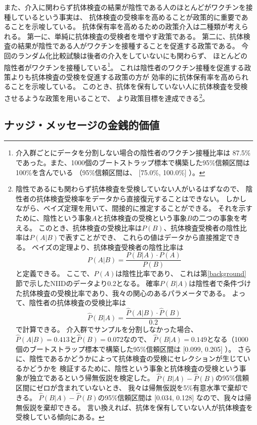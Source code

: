 \documentclass[
  11pt,
  a4paper,
]{article}
\begin{document}
また、介入に関わらず抗体検査の結果が陰性である人のほとんどがワクチンを接種しているという事実は、
抗体検査の受検率を高めることが政策的に重要であることを示唆している。
抗体保有率を高めるための政策介入は二種類が考えられる。
第一に、単純に抗体検査の受検者を増やす政策である。
第二に、抗体検査の結果が陰性である人がワクチンを接種することを促進する政策である。
今回のランダム化比較試験は後者の介入をしていないにも関わらず、
ほとんどの陰性者がワクチンを接種している\footnote{介入群ごとにデータを分割しない場合の陰性者のワクチン接種比率は
  87.5\%
  であった。また、1000個のブートストラップ標本で構築した95\%信頼区間は100\%を含んでいる
  （95\%信頼区間は、
  {[}75.0\%, 100.0\%{]}
  ）。}。
これは陰性者のワクチン接種を促進する政策よりも抗体検査の受検を促進する政策の方が
効率的に抗体保有率を高められることを示唆している。
このとき、抗体を保有していない人に抗体検査を受検させるような政策を用いることで、
より政策目標を達成できる\footnote{陰性であるにも関わらず抗体検査を受検していない人がいるはずなので、
  陰性者の抗体検査受検率をデータから直接復元することはできない。
  しかしながら、ベイズ定理を用いて、間接的に推定することができる。
  それを示すために、陰性という事象\(A\)と抗体検査の受検という事象\(B\)の二つの事象を考える。
  このとき、抗体検査の受検比率は\(P(B)\)、抗体検査受検者の陰性比率は\(P(A|B)\)で表すことができ、
  これらの値はデータから直接推定できる。
  ベイズの定理より、抗体検査受検者の陰性比率は
  \[ P(A|B) = \frac{P(B|A) \cdot P(A)}{P(B)} \]
  と定義できる。
  ここで、\(P(A)\)は陰性比率であり、
  これは第\ref{background}節で示したNIIDのデータより0.2となる。
  確率\(P(B|A)\)は陰性者で条件づけた抗体検査の受検比率であり、我々の関心のあるパラメータである。
  よって、陰性者の抗体検査の受検比率は
  \[ \hat{P}(B|A) = \frac{\hat{P}(A|B) \cdot \hat{P}(B)}{0.2} \]
  で計算できる。
  介入群でサンプルを分割しなかった場合、
  \(\hat{P}(A|B) = 0.413\)と\(\hat{P}(B) = 0.072\)なので、
  \(\hat{P}(B|A) = 0.149\)となる（1000個のブートストラップ標本で構築した95\%信頼区間は
  {[}0.099, 0.205{]} ）。
  さらに、陰性であるかどうかによって抗体検査の受検にセレクションが生じているかどうかを
  検証するために、陰性という事象と抗体検査の受検という事象が独立であるという帰無仮説を検定した。
  \(\hat{P}(B|A) - \hat{P}(B)\)の95\%信頼区間にゼロが含まれていないとき、
  我々は帰無仮説を5\%有意水準で棄却できる。
  \(\hat{P}(B|A) - \hat{P}(B)\)の95\%信頼区間は
  {[}0.034, 0.128{]}
  なので、我々は帰無仮説を棄却できる。
  言い換えれば、抗体を保有していない人が抗体検査を受検している傾向にある。}。

\hypertarget{econvalue}{%
\subsection{ナッジ・メッセージの金銭的価値}\label{econvalue}}
\end{document}
